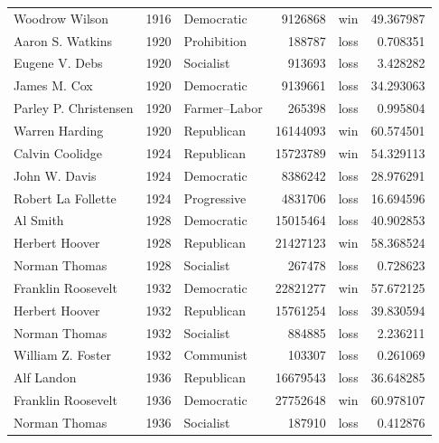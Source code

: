 \documentclass[
  letterpaper,
  DIV=11,
  numbers=noendperiod]{scrreprt}
\begin{document}
\begin{tabular}{lrlrlr}
Woodrow Wilson         &  1916 &             Democratic &       9126868 &    win &  49.367987 \\
Aaron S. Watkins       &  1920 &            Prohibition &        188787 &   loss &   0.708351 \\
Eugene V. Debs         &  1920 &              Socialist &        913693 &   loss &   3.428282 \\
James M. Cox           &  1920 &             Democratic &       9139661 &   loss &  34.293063 \\
Parley P. Christensen  &  1920 &           Farmer–Labor &        265398 &   loss &   0.995804 \\
Warren Harding         &  1920 &             Republican &      16144093 &    win &  60.574501 \\
Calvin Coolidge        &  1924 &             Republican &      15723789 &    win &  54.329113 \\
John W. Davis          &  1924 &             Democratic &       8386242 &   loss &  28.976291 \\
Robert La Follette     &  1924 &            Progressive &       4831706 &   loss &  16.694596 \\
Al Smith               &  1928 &             Democratic &      15015464 &   loss &  40.902853 \\
Herbert Hoover         &  1928 &             Republican &      21427123 &    win &  58.368524 \\
Norman Thomas          &  1928 &              Socialist &        267478 &   loss &   0.728623 \\
Franklin Roosevelt     &  1932 &             Democratic &      22821277 &    win &  57.672125 \\
Herbert Hoover         &  1932 &             Republican &      15761254 &   loss &  39.830594 \\
Norman Thomas          &  1932 &              Socialist &        884885 &   loss &   2.236211 \\
William Z. Foster      &  1932 &              Communist &        103307 &   loss &   0.261069 \\
Alf Landon             &  1936 &             Republican &      16679543 &   loss &  36.648285 \\
Franklin Roosevelt     &  1936 &             Democratic &      27752648 &    win &  60.978107 \\
Norman Thomas          &  1936 &              Socialist &        187910 &   loss &   0.412876 \\

\end{tabular}
\end{document}
